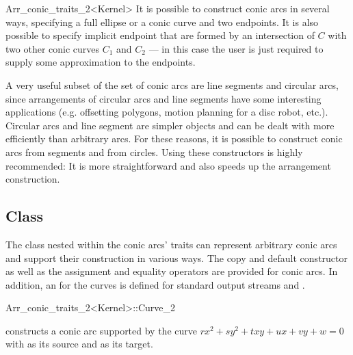\begin{ccRefClass}{Arr_conic_traits_2<Kernel>}
    It is possible to construct conic arcs in several ways, specifying a full
    ellipse or a conic curve and two endpoints. It is also possible to specify
    implicit endpoint that are formed by an intersection of $C$ with two other
    conic curves $C_1$ and $C_2$ --- in this case the user is just required to
    supply some approximation to the endpoints.

    A very useful subset of the set of conic arcs are line segments and 
    circular arcs, since arrangements of circular arcs and line segments have 
    some interesting applications (e.g. offsetting polygons, motion planning 
    for a disc robot, etc.). Circular arcs and line segment are simpler 
    objects and can be dealt with more efficiently than arbitrary arcs. 
    For these reasons, it is possible to construct conic arcs from segments 
    and from circles. Using these constructors is highly recommended: It is 
    more straightforward and also speeds up the arrangement construction.


\ccIsModel
     

%
\subsection*{Class }

The  class nested within the conic arcs' traits can represent
arbitrary conic arcs and support their construction in various ways. The copy 
and default constructor as well as the assignment and equality operators are 
provided for conic arcs. In addition, an  for the curves is 
defined for standard output streams and .

\begin{ccClass}{Arr_conic_traits_2<Kernel>::Curve_2}
    \ccCreation

  {constructs a conic arc supported by the curve $rx^2 + sy^2 + txy + ux + 
   vy + w = 0$ with  as its source and  as its target.
   }


\end{ccClass}
\end{ccRefClass}
